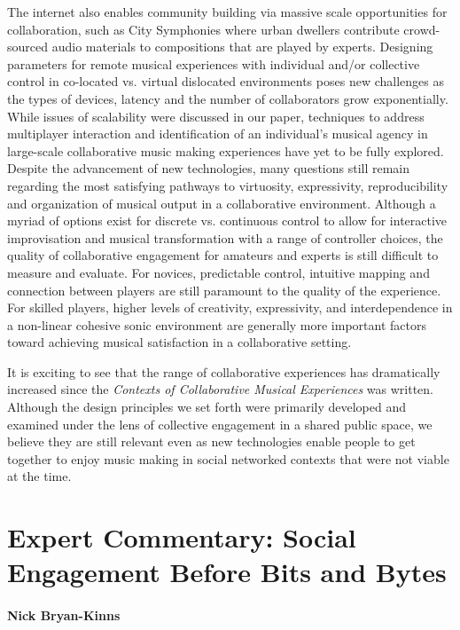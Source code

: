 The internet also enables community building via massive scale opportunities for collaboration, such as City Symphonies \cite{Machover:2013} where urban dwellers contribute crowd-sourced audio materials to compositions that are played by experts. Designing parameters for remote musical experiences with individual and/or collective control in co-located vs. virtual dislocated environments poses new challenges as the types of devices, latency and the number of collaborators grow exponentially. While issues of scalability were discussed in our paper, techniques to address multiplayer interaction and identification of an individual's musical agency in large-scale collaborative music making experiences have yet to be fully explored.
Despite the advancement of new technologies, many questions still remain regarding the most satisfying pathways to virtuosity, expressivity, reproducibility and organization of musical output in a collaborative environment.  Although a myriad of options exist for discrete vs. continuous control to allow for interactive improvisation and musical transformation with a range of controller choices, the quality of collaborative engagement for amateurs and experts is still difficult to measure and evaluate.   For novices, predictable control, intuitive mapping and connection between players are still paramount to the quality of the experience.  For skilled players, higher levels of creativity, expressivity, and interdependence in a non-linear cohesive sonic environment are generally more important factors toward achieving musical satisfaction in a collaborative setting.
 
It is exciting to see that the range of collaborative experiences has dramatically increased since the \textit{Contexts of Collaborative Musical Experiences} was written. Although the design principles we set forth were primarily developed and examined under the lens of collective engagement in a shared public space, we believe they are still relevant even as new technologies enable people to get together to enjoy music making in social networked contexts that were not viable at the time.

\section*{Expert Commentary: Social Engagement Before Bits and Bytes}

\paragraph{Nick Bryan-Kinns}

